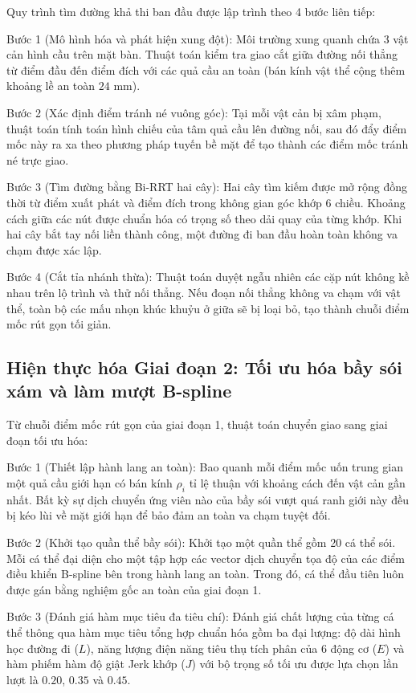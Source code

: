 Quy trình tìm đường khả thi ban đầu được lập trình theo 4 bước liên tiếp:

Bước 1 (Mô hình hóa và phát hiện xung đột): Môi trường xung quanh chứa 3 vật cản hình cầu trên mặt bàn. Thuật toán kiểm tra giao cắt giữa đường nối thẳng từ điểm đầu đến điểm đích với các quả cầu an toàn (bán kính vật thể cộng thêm khoảng lề an toàn $24\text{ mm}$).

Bước 2 (Xác định điểm tránh né vuông góc): Tại mỗi vật cản bị xâm phạm, thuật toán tính toán hình chiếu của tâm quả cầu lên đường nối, sau đó đẩy điểm mốc này ra xa theo phương pháp tuyến bề mặt để tạo thành các điểm mốc tránh né trực giao.

Bước 3 (Tìm đường bằng Bi-RRT hai cây): Hai cây tìm kiếm được mở rộng đồng thời từ điểm xuất phát và điểm đích trong không gian góc khớp 6 chiều. Khoảng cách giữa các nút được chuẩn hóa có trọng số theo dải quay của từng khớp. Khi hai cây bắt tay nối liền thành công, một đường đi ban đầu hoàn toàn không va chạm được xác lập.

Bước 4 (Cắt tỉa nhánh thừa): Thuật toán duyệt ngẫu nhiên các cặp nút không kề nhau trên lộ trình và thử nối thẳng. Nếu đoạn nối thẳng không va chạm với vật thể, toàn bộ các mấu nhọn khúc khuỷu ở giữa sẽ bị loại bỏ, tạo thành chuỗi điểm mốc rút gọn tối giản.

\subsection{Hiện thực hóa Giai đoạn 2: Tối ưu hóa bầy sói xám và làm mượt B-spline}

Từ chuỗi điểm mốc rút gọn của giai đoạn 1, thuật toán chuyển giao sang giai đoạn tối ưu hóa:

Bước 1 (Thiết lập hành lang an toàn): Bao quanh mỗi điểm mốc uốn trung gian một quả cầu giới hạn có bán kính $\rho_i$ tỉ lệ thuận với khoảng cách đến vật cản gần nhất. Bất kỳ sự dịch chuyển ứng viên nào của bầy sói vượt quá ranh giới này đều bị kéo lùi về mặt giới hạn để bảo đảm an toàn va chạm tuyệt đối.

Bước 2 (Khởi tạo quần thể bầy sói): Khởi tạo một quần thể gồm 20 cá thể sói. Mỗi cá thể đại diện cho một tập hợp các vector dịch chuyển tọa độ của các điểm điều khiển B-spline bên trong hành lang an toàn. Trong đó, cá thể đầu tiên luôn được gán bằng nghiệm gốc an toàn của giai đoạn 1.

Bước 3 (Đánh giá hàm mục tiêu đa tiêu chí): Đánh giá chất lượng của từng cá thể thông qua hàm mục tiêu tổng hợp chuẩn hóa gồm ba đại lượng: độ dài hình học đường đi ($L$), năng lượng điện năng tiêu thụ tích phân của 6 động cơ ($E$) và hàm phiếm hàm độ giật Jerk khớp ($J$) với bộ trọng số tối ưu được lựa chọn lần lượt là $0.20$, $0.35$ và $0.45$.

